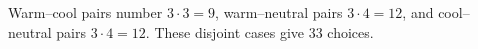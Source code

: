 Warm--cool pairs number $3\cdot3=9$, warm--neutral pairs $3\cdot4=12$, and cool--neutral pairs $3\cdot4=12$. These disjoint cases give $\boxed{33}$ choices.

